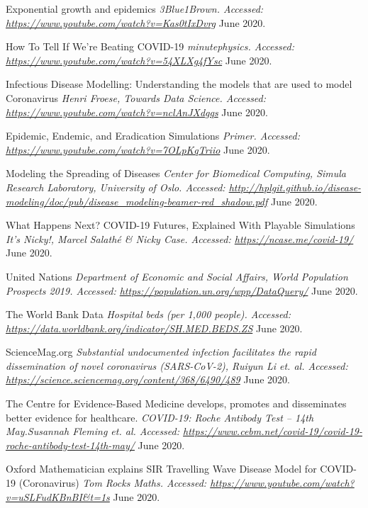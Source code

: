 \begin{thebibliography}{1}
 Exponential growth and epidemics {\em 3Blue1Brown. Accessed:  \url{https://www.youtube.com/watch?v=Kas0tIxDvrg}} June 2020.

 How To Tell If We're Beating COVID-19 {\em 
minutephysics. Accessed:  \url{https://www.youtube.com/watch?v=54XLXg4fYsc}} June 2020.

 Infectious Disease Modelling: Understanding the models that are used to model Coronavirus {\em Henri Froese, Towards Data Science. Accessed:  \url{https://www.youtube.com/watch?v=nclAnJXdgqs}} June 2020.

 Epidemic, Endemic, and Eradication Simulations {\em Primer. Accessed:  \url{https://www.youtube.com/watch?v=7OLpKqTriio}} June 2020.

 Modeling the Spreading of Diseases {\em Center for Biomedical Computing, Simula Research Laboratory, University of Oslo. Accessed:  \url{http://hplgit.github.io/disease-modeling/doc/pub/disease_modeling-beamer-red_shadow.pdf}} June 2020.

 What Happens Next? COVID-19 Futures, Explained With Playable Simulations {\em It's Nicky!, Marcel Salathé & Nicky Case. Accessed:  \url{https://ncase.me/covid-19/}} June 2020.

 United Nations {\em Department of Economic and Social Affairs, World Population Prospects 2019. Accessed:  \url{https://population.un.org/wpp/DataQuery/}} June 2020.

 The World Bank Data {\em Hospital beds (per 1,000 people). Accessed:  \url{https://data.worldbank.org/indicator/SH.MED.BEDS.ZS}} June 2020.

 ScienceMag.org {\em Substantial undocumented infection facilitates the rapid dissemination of novel coronavirus (SARS-CoV-2), Ruiyun Li et. al. Accessed:  \url{https://science.sciencemag.org/content/368/6490/489}} June 2020.

 The Centre for Evidence-Based Medicine develops, promotes and disseminates better evidence for healthcare. {\em COVID-19: Roche Antibody Test – 14th May.Susannah Fleming et. al. Accessed:  \url{https://www.cebm.net/covid-19/covid-19-roche-antibody-test-14th-may/}} June 2020.

 Oxford Mathematician explains SIR Travelling Wave Disease Model for COVID-19 (Coronavirus) {\em Tom Rocks Maths. Accessed:  \url{https://www.youtube.com/watch?v=uSLFudKBnBI&t=1s}} June 2020.


\end{thebibliography}
